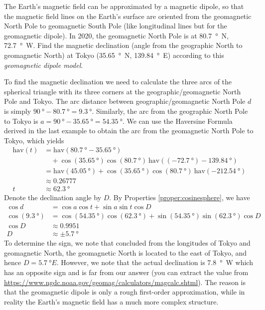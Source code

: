 \begin{exmp}
The Earth's magnetic field can be approximated by a magnetic dipole, so that the magnetic field lines on the Earth's surface are oriented from the geomagnetic North Pole to geomagnetic South Pole (like longitudinal lines but for the geomagnetic dipole). In 2020, the geomagnetic North Pole is at \SI{80.7}{\degree N}, \SI{72.7}{\degree W}. Find the magnetic declination (angle from the geographic North to geomagnetic North) at Tokyo (\SI{35.65}{\degree N}, \SI{139.84}{\degree E}) according to this \textit{geomagnetic dipole model}.
\end{exmp}
\begin{solution}
To find the magnetic declination we need to calculate the three arcs of the spherical triangle with its three corners at the geographic/geomagnetic North Pole and Tokyo. The arc distance between geographic/geomagnetic North Pole $d$ is simply $\SI{90}{\degree} - \SI{80.7}{\degree} = \SI{9.3}{\degree}$. Similarly, the arc from the geographic North Pole to Tokyo is $a = \SI{90}{\degree} - \SI{35.65}{\degree} = \SI{54.35}{\degree}$. We can use the Haversine Formula derived in the last example to obtain the arc from the geomagnetic North Pole to Tokyo, which yields
\begin{align*}
\text{hav}(t) &= \text{hav}(\SI{80.7}{\degree} - \SI{35.65}{\degree}) \\ 
&\quad + \cos(\SI{35.65}{\degree}) \cos(\SI{80.7}{\degree})\ \text{hav}((\SI{-72.7}{\degree}) - \SI{139.84}{\degree}) \\
&= \text{hav}(\SI{45.05}{\degree}) + \cos(\SI{35.65}{\degree}) \cos(\SI{80.7}{\degree})\ \text{hav}(\SI{-212.54}{\degree}) \\
&\approx 0.26777 \\
t &\approx \SI{62.3}{\degree}
\end{align*}
Denote the declination angle by $D$. By Properties \ref{proper:cosinesphere}, we have
\begin{align*}
\cos d &= \cos a \cos t + \sin a \sin t \cos D \\
\cos (\SI{9.3}{\degree}) &= \cos (\SI{54.35}{\degree}) \cos (\SI{62.3}{\degree}) + \sin (\SI{54.35}{\degree}) \sin (\SI{62.3}{\degree}) \cos D \\
\cos D &\approx 0.9951 \\
D &\approx \pm \SI{5.7}{\degree}
\end{align*}
To determine the sign, we note that concluded from the longitudes of Tokyo and geomagnetic North, the geomagnetic North is located to the east of Tokyo, and hence $D = \SI{5.7}{\degree E}$. However, we note that the actual declination is \SI{7.8}{\degree W} which has an opposite sign and is far from our answer (you can extract the value from \href{https://www.ngdc.noaa.gov/geomag/calculators/magcalc.shtml}{https://www.ngdc.noaa.gov/geomag/calculators/magcalc.shtml}). The reason is that the geomagnetic dipole is only a rough first-order approximation, while in reality the Earth's magnetic field has a much more complex structure.
\end{solution}

